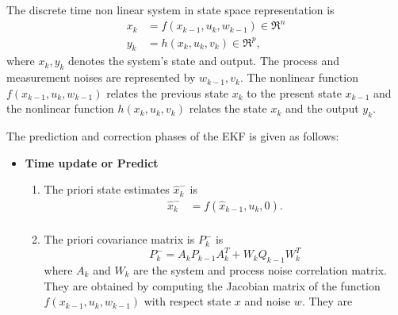 The discrete time non linear system in state space representation is
\begin{equation}
\label{eq:nl_disc}
\begin{split}
x_{k} &= f(x_{k-1},u_k,w_{k-1}) \in \Re^{n}\\
y_k &= h(x_k,u_k,v_k) \in \Re^{p},
\end{split}
\end{equation}
where $x_k,y_k$ denotes the system's state and output. The process and measurement noises are represented by $w_{k-1},v_k$. The nonlinear function $f(x_{k-1},u_k,w_{k-1})$ relates the previous state $x_k$ to the present state $x_{k-1}$ and the nonlinear function $h(x_k,u_k,v_k)$ relates the state $x_k$ and the output $y_k$. 

The prediction and correction phases of the EKF is given as follows:
\begin{itemize}
\item \textbf{Time update or Predict}
\begin{enumerate}
\item The priori state estimates $\hat x_k^{-}$ is
\begin{equation}
	\begin{split}
	\label{eq:ekf_priori}
	\hat{x}_k^- &= f(\hat{x}_{k-1},u_{k},0).\\
	\end{split}
\end{equation}
\item The priori covariance matrix is $P_k^-$ is
\begin{equation} P_k^- = A_kP_{k-1}A_k^T + W_kQ_{k-1}W_k^T \end{equation}
where $A_k$ and $W_k$ are the system and process noise correlation matrix. They are obtained by computing the Jacobian matrix of the function $f(x_{k-1},u_k,w_{k-1})$ with respect state $x$ and noise $w$. They are
\begin{equation}
	\begin{split}

\end{split}
\end{equation}
\end{enumerate}
\end{itemize}
